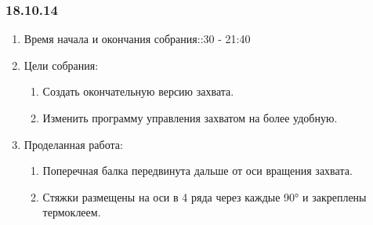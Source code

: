 
\subsubsection{18.10.14}

\begin{enumerate}
	\item Время начала и окончания собрания::30 - 21:40
	\item Цели собрания:\newline
	\begin{enumerate}
	  \item Создать окончательную версию захвата.\newline
	  
	  \item Изменить программу управления захватом на более удобную.\newline
	  
    \end{enumerate}
    
	\item Проделанная работа:\newline
	\begin{enumerate}
	  \item Поперечная балка передвинута дальше от оси вращения захвата.\newline
      
      \item Стяжки размещены на оси в 4 ряда через каждые 90° и закреплены термоклеем.\newline
      

\end{enumerate}
\end{enumerate}
